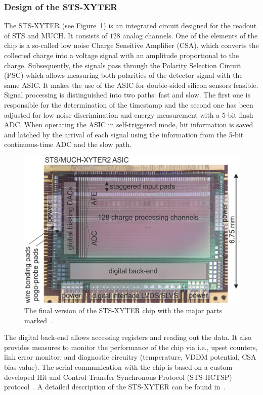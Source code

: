 \subsubsection{Design of the STS-XYTER}

The STS-XYTER (see Figure~\ref{sts_xyter}) is an integrated circuit designed for the readout of \gls{STS} and \gls{MUCH}. It consists of $128$ analog channels. One of the elements of the chip is a so-called low noise Charge Sensitive Amplifier (\gls{CSA}), which converts the collected charge into a voltage signal with an amplitude proportional to the charge. Subsequently, the signals pass through the Polarity Selection Circuit (\gls{PSC}) which allows measuring both polarities
  of the detector signal with the same \gls{ASIC}. It makes the use of the \gls{ASIC} for double-sided silicon sensors feasible. Signal processing is distinguished into two paths: fast and slow. The first one is responsible for the determination of the timestamp and the second one has been adjusted for low noise discrimination and energy measurement with a 5-bit flash \gls{ADC}. When operating the \gls{ASIC} in self-triggered mode, hit information is saved and latched by the arrival of each signal using the information from the 5-bit continuous-time \gls{ADC} and the slow path. 

\begin{figure}[!h]
\centering
\includegraphics[width=0.65\columnwidth]{Chapter2/images/ASIC2.2.png}
\caption{The final version of the STS-XYTER chip with the major parts marked~\cite{KASINSKI2018225}.}
\label{sts_xyter}
\end{figure}

The digital back-end allows accessing registers and reading out the data. It also provides measures to monitor the performance of the chip via i.e., upset counters, link error monitor, and diagnostic circuitry (temperature, VDDM potential, CSA bias value). The serial communication with the chip is based on a custom-developed Hit and Control Transfer Synchronous Protocol (STS-HCTSP) protocol~\cite{Kasinski_2016}. A detailed description of the STS-XYTER can be found in~\cite{RodriguezRodriguez2020}.


